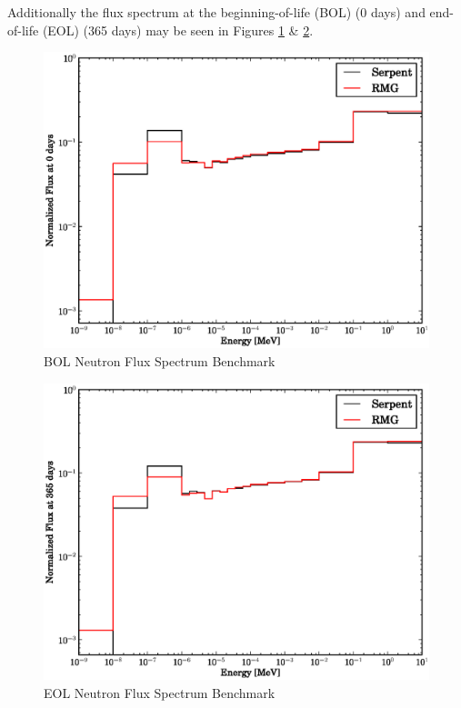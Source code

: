 Additionally the flux spectrum at the beginning-of-life (BOL) (0 days) and end-of-life (EOL) (365 days)
may be seen in Figures \ref{spec_BOL} \& \ref{spec_EOL}.
\begin{figure}[htbp]
\caption{BOL Neutron Flux Spectrum Benchmark}
\label{spec_BOL}
\begin{center}
\includegraphics[scale=0.5]{multigroup_method/figs/benchmark/Normalized_Flux_at_0_days.eps}
\end{center}
\end{figure}
\begin{figure}[htbp]
\caption{EOL Neutron Flux Spectrum Benchmark}
\label{spec_EOL}
\begin{center}
\includegraphics[scale=0.5]{multigroup_method/figs/benchmark/Normalized_Flux_at_365_days.eps}
\end{center}
\end{figure}

